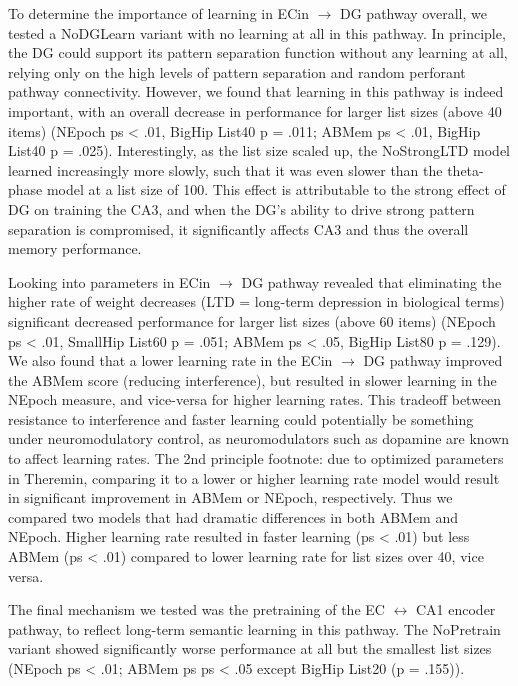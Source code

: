 \documentclass[11pt,twoside]{article}
\newif\myifpdf
\begin{document}
To determine the importance of learning in ECin $\rightarrow$ DG pathway overall, we tested a NoDGLearn variant with no learning at all in this pathway.  In principle, the DG could support its pattern separation function without any learning at all, relying only on the high levels of pattern separation and random perforant pathway connectivity.  However, we found that learning in this pathway is indeed important, with an overall decrease in performance for larger list sizes (above 40 items) (NEpoch ps < .01, BigHip List40 p = .011; ABMem ps < .01, BigHip List40 p = .025).  Interestingly, as the list size scaled up, the NoStrongLTD model learned increasingly more slowly, such that it was even slower than the theta-phase model at a list size of 100. This effect is attributable to the strong effect of DG on training the CA3, and when the DG's ability to drive strong pattern separation is compromised, it significantly affects CA3 and thus the overall memory performance.

Looking into parameters in ECin $\rightarrow$ DG pathway revealed that eliminating the higher rate of weight decreases (LTD = long-term depression in biological terms) significant decreased performance for larger list sizes (above 60 items) (NEpoch ps < .01, SmallHip List60 p = .051; ABMem ps < .05, BigHip List80 p = .129).  We also found that a lower learning rate in the ECin $\rightarrow$ DG pathway improved the ABMem score (reducing interference), but resulted in slower learning in the NEpoch measure, and vice-versa for higher learning rates.  This tradeoff between resistance to interference and faster learning could potentially be something under neuromodulatory control, as neuromodulators such as dopamine are known to affect learning rates.  The 2nd principle
footnote: due to optimized parameters in Theremin, comparing it to a lower or higher learning rate model would result in significant improvement in ABMem or NEpoch, respectively. Thus we compared two models that had dramatic differences in both ABMem and NEpoch. Higher learning rate resulted in faster learning (ps < .01) but less ABMem (ps < .01) compared to lower learning rate for list sizes over 40, vice versa.

The final mechanism we tested was the pretraining of the EC $\leftrightarrow$ CA1 encoder pathway, to reflect long-term semantic learning in this pathway.  The NoPretrain variant showed significantly worse performance at all but the smallest list sizes (NEpoch ps < .01; ABMem ps ps < .05 except BigHip List20 (p = .155)). 
\end{document}

